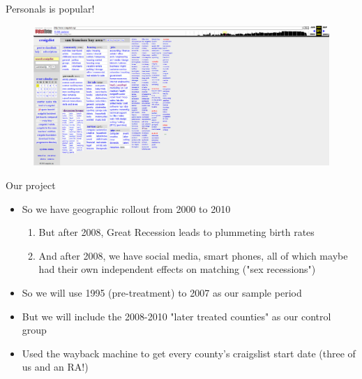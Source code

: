 \documentclass{beamer}
\begin{document}
\begin{frame}{Personals is popular!}
\begin{figure}
    \centering
    \includegraphics[height=0.85\textheight]{./lecture_includes/melanie8}
\end{figure}

\end{frame}


\begin{frame}{Our project}

\begin{itemize}
\item So we have geographic rollout from 2000 to 2010
	\begin{enumerate}
\item But after 2008, Great Recession leads to plummeting birth rates
\item And after 2008, we have social media, smart phones, all of which maybe had their own independent effects on matching ("sex recessions")
	\end{enumerate}
\item So we will use 1995 (pre-treatment) to 2007 as our sample period
\item But we will include the 2008-2010 "later treated counties" as our control group
\item Used the wayback machine to get every county's craigslist start date (three of us and an RA!)
\end{itemize}

\end{frame}
\end{document}
